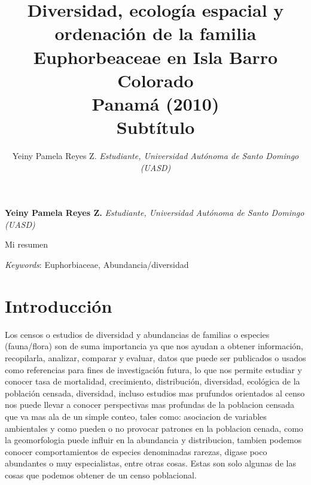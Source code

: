 \documentclass[11pt,]{article}
\title{Diversidad, ecología espacial y ordenación de la familia Euphorbeaceae
en Isla Barro Colorado\\
Panamá (2010)\\
Subtítulo  }
\author{\Large Yeiny Pamela Reyes Z.\vspace{0.05in} \newline\normalsize\emph{Estudiante, Universidad Autónoma de Santo Domingo (UASD)}  }
\date{}
\newcommand*{\authorfont}{\fontfamily{phv}\selectfont}
\renewenvironment{abstract}
 {{%
    \setlength{\leftmargin}{0mm}
    \setlength{\rightmargin}{\leftmargin}%
  }%
  \relax}
 {\endlist}
\begin{document}
	
%

{%
\setlength{\parindent}{0pt}
\thispagestyle{plain}
{\fontsize{18}{20}\selectfont\raggedright 
\maketitle  %

}

{
   \vskip 13.5pt\relax \normalsize\fontsize{11}{12} 
\textbf{\authorfont Yeiny Pamela Reyes Z.} \hskip 15pt \emph{\small Estudiante, Universidad Autónoma de Santo Domingo (UASD)}   

}

}








\begin{abstract}

    \hbox{\vrule height .2pt width 39.14pc}

    \vskip 8.5pt %

\noindent Mi resumen


\vskip 8.5pt \noindent \emph{Keywords}: Euphorbiaceae, Abundancia/diversidad \par

    \hbox{\vrule height .2pt width 39.14pc}



\end{abstract}


\vskip 6.5pt


\noindent  \section{Introducción}\label{introducciuxf3n}

Los censos o estudios de diversidad y abundancias de familias o especies
(fauna/flora) son de suma importancia ya que nos ayudan a obtener
información, recopilarla, analizar, comparar y evaluar, datos que puede
ser publicados o usados como referencias para fines de investigación
futura, lo que nos permite estudiar y conocer tasa de mortalidad,
crecimiento, distribución, diversidad, ecológica de la población
censada, diversidad, incluso estudios mas prufundos orientados al censo
nos puede llevar a conocer perspectivas mas profundas de la poblacion
censada que va mas ala de un simple conteo, tales como: asociacion de
variables ambientales y como pueden o no provocar patrones en la
poblacion cenada, como la geomorfologia puede influir en la abundancia y
distribucion, tambien podemos conocer comportamientos de especies
denominadas rarezas, digase poco abundantes o muy especialistas, entre
otras cosas. Estas son solo algunas de las cosas que podemos obtener de
un censo poblacional.
\end{document}
